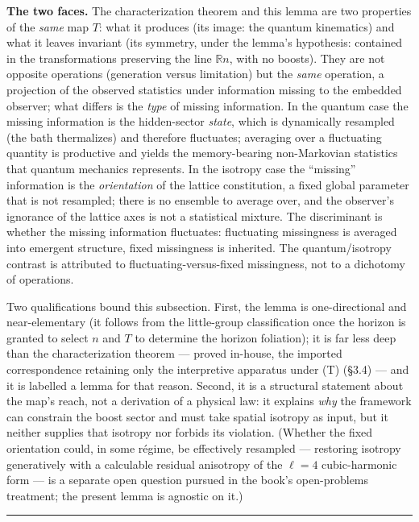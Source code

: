 \documentclass[
]{article}
\begin{document}
\textbf{The two faces.} The characterization theorem and this lemma are
two properties of the \emph{same} map \(T\): what it produces (its
image: the quantum kinematics) and what it leaves invariant (its
symmetry, under the lemma's hypothesis: contained in the transformations
preserving the line \(\mathbb{R}n\), with no boosts). They are not
opposite operations (generation versus limitation) but the \emph{same}
operation, a projection of the observed statistics under information
missing to the embedded observer; what differs is the \emph{type} of
missing information. In the quantum case the missing information is the
hidden-sector \emph{state}, which is dynamically resampled (the bath
thermalizes) and therefore fluctuates; averaging over a fluctuating
quantity is productive and yields the memory-bearing non-Markovian
statistics that quantum mechanics represents. In the isotropy case the
``missing'' information is the \emph{orientation} of the lattice
constitution, a fixed global parameter that is not resampled; there is
no ensemble to average over, and the observer's ignorance of the lattice
axes is not a statistical mixture. The discriminant is whether the
missing information fluctuates: fluctuating missingness is averaged into
emergent structure, fixed missingness is inherited. The quantum/isotropy
contrast is attributed to fluctuating-versus-fixed missingness, not to a
dichotomy of operations.

Two qualifications bound this subsection. First, the lemma is
one-directional and near-elementary (it follows from the little-group
classification once the horizon is granted to select \(n\) and \(T\) to
determine the horizon foliation); it is far less deep than the
characterization theorem --- proved in-house, the imported
correspondence retaining only the interpretive apparatus under (T)
(§3.4) --- and it is labelled a lemma for that reason. Second, it is a
structural statement about the map's reach, not a derivation of a
physical law: it explains \emph{why} the framework can constrain the
boost sector and must take spatial isotropy as input, but it neither
supplies that isotropy nor forbids its violation. (Whether the fixed
orientation could, in some régime, be effectively resampled ---
restoring isotropy generatively with a calculable residual anisotropy of
the \(\ell=4\) cubic-harmonic form --- is a separate open question
pursued in the book's open-problems treatment; the present lemma is
agnostic on it.)

\begin{center}\rule{0.5\linewidth}{0.5pt}\end{center}
\end{document}

